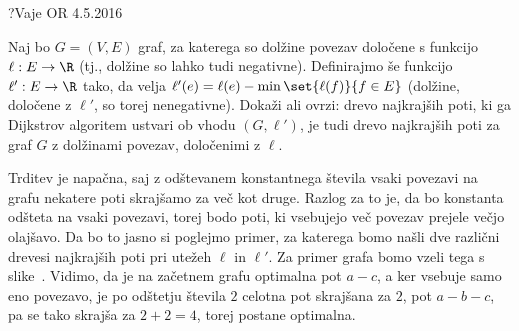 \begin{naloga}{?}{Vaje OR 4.5.2016}
\begin{vprasanje}
Naj bo $G = (V, E)$ graf,
za katerega so dolžine povezav določene s funkcijo $\ell : E \to \R$
(tj., dolžine so lahko tudi negativne).
Definirajmo še funkcijo $\ell' : E \to \R$ tako,
da velja $\ell'(e) = \ell(e) - \min\set{\ell(f)}{f \in E}$
(dolžine, določene z $\ell'$, so torej nenegativne).
Dokaži ali ovrzi: drevo najkrajših poti,
ki ga Dijkstrov algoritem ustvari ob vhodu $(G, \ell')$,
je tudi drevo najkrajših poti za graf $G$ z dolžinami povezav,
določenimi z $\ell$.
\end{vprasanje}
\begin{odgovor}

Trditev je napačna, saj z odštevanem konstantnega števila vsaki povezavi na grafu 
nekatere poti skrajšamo za več kot druge.
Razlog za to je, da bo konstanta odšteta na vsaki povezavi, 
torej bodo poti, ki vsebujejo več povezav prejele večjo olajšavo.
Da bo to jasno si poglejmo primer, 
za katerega bomo našli dve različni drevesi najkrajših poti pri utežeh $\ell$ in $\ell'$.
Za primer grafa bomo vzeli tega s slike~\fig.
Vidimo, da je na začetnem grafu optimalna pot $a-c$, a ker vsebuje samo eno povezavo, 
je po odštetju števila $2$ celotna pot skrajšana za $2$, pot $a-b-c$, 
pa se tako skrajša za $2 + 2 = 4$, torej postane optimalna.

\begin{slika}
\pgfslika
{}
\end{slika}

\end{odgovor}
\end{naloga}
